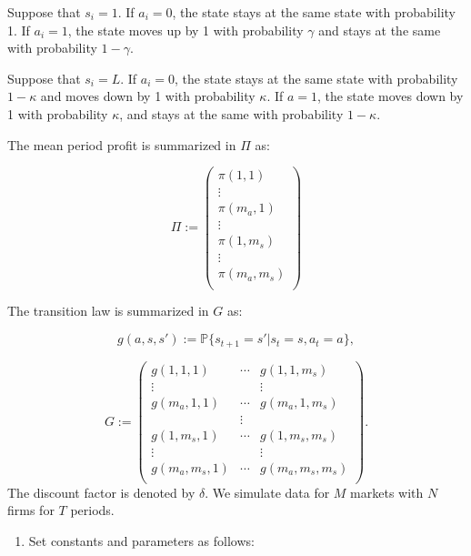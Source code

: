 \documentclass[
]{book}
\providecommand{\tightlist}{%
  \setlength{\itemsep}{0pt}\setlength{\parskip}{0pt}}
\begin{document}
Suppose that \(s_i = 1\). If \(a_i = 0\), the state stays at the same state with probability 1. If \(a_i = 1\), the state moves up by 1 with probability \(\gamma\) and stays at the same with probability \(1 - \gamma\).

Suppose that \(s_i = L\). If \(a_i = 0\), the state stays at the same state with probability \(1 - \kappa\) and moves down by 1 with probability \(\kappa\). If \(a = 1\), the state moves down by 1 with probability \(\kappa\), and stays at the same with probability \(1 - \kappa\).

The mean period profit is summarized in \(\Pi\) as:

\[
\Pi :=
\begin{pmatrix}
\pi(1, 1)\\
\vdots\\
\pi(m_a, 1)\\
\vdots \\
\pi(1, m_s)\\
\vdots\\
\pi(m_a, m_s)\\
\end{pmatrix}
\]

The transition law is summarized in \(G\) as:

\[
g(a, s, s') := \mathbb{P}\{s_{t + 1} = s'|s_t = s, a_t = a\},
\]

\[
G := 
\begin{pmatrix}
g(1, 1, 1) & \cdots & g(1, 1, m_s)\\
\vdots & & \vdots \\
g(m_a, 1, 1) & \cdots & g(m_a, 1, m_s)\\
& \vdots & \\
g(1, m_s, 1) & \cdots & g(1, m_s, m_s)\\
\vdots & & \vdots \\
g(m_a, m_s, 1) & \cdots & g(m_a, m_s, m_s)\\
\end{pmatrix}.
\]
The discount factor is denoted by \(\delta\). We simulate data for \(M\) markets with \(N\) firms for \(T\) periods.

\begin{enumerate}
\def\labelenumi{\arabic{enumi}.}
\tightlist
\item
  Set constants and parameters as follows:
\end{enumerate}
\end{document}
